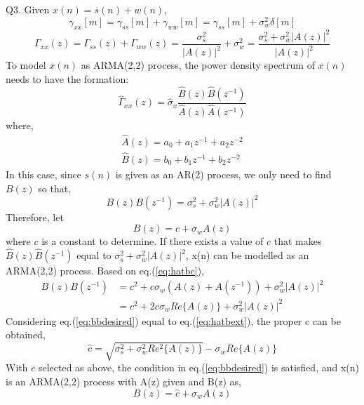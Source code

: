 \documentclass[12pt]{article}
\begin{document}
\noindent
Q3.
Given $x(n)=s(n)+w(n)$, 
\begin{equation}
	\gamma_{xx}[m]=\gamma_{ss}[m]+\gamma_{ww}[m]=\gamma_{ss}[m]+\sigma_{w}^{2}\delta[m]
\end{equation}
\begin{equation}
	\Gamma_{xx}(z)=\Gamma_{ss}(z)+\Gamma_{ww}(z)=\frac{\sigma_{s}^{2}}{|A(z)|^{2}}+\sigma_{w}^{2}=\frac{\sigma_{s}^{2}+\sigma_{w}^{2}|A(z)|^{2}}{|A(z)|^{2}}
\end{equation}
To model $x(n)$ as ARMA(2,2) process, the power density spectrum of $x(n)$ needs to have the formation:
\begin{equation}
	\hat{\Gamma}_{xx}(z)=\hat{\sigma}_{x}\frac{\hat{B}(z)\hat{B}(z^{-1})}{\hat{A}(z)\hat{A}(z^{-1})}
\end{equation}
where,
\begin{equation}
\begin{split}
	\hat{A}(z)=a_{0}+a_{1}z^{-1}+a_{2}z^{-2}\\
	\hat{B}(z)=b_{0}+b_{1}z^{-1}+b_{2}z^{-2}
\end{split}
\end{equation}
In this case, since $s(n)$ is given as an AR(2) process, we only need to find $B(z)$ so that,
\begin{equation}
\label{eq:bbdesired}
	B(z)B(z^{-1})=\sigma_{s}^{2}+\sigma_{w}^{2}|A(z)|^{2}
\end{equation}
Therefore, let 
\begin{equation}
\label{eq:hatbc}
	B(z)=c+\sigma_{w}A(z)
\end{equation}
where $c$ is a constant to determine. If there exists a value of $c$ that makes $\hat{B}(z)\hat{B}(z^{-1})$ equal to $\sigma_{s}^{2}+\sigma_{w}^{2}|A(z)|^{2}$, x(n) can be modelled as an ARMA(2,2) process. 
Based on eq.(\ref{eq:hatbc}), 
\begin{equation}
\label{eq:hatbext}
\begin{split}
		B(z)B(z^{-1})&=c^{2}+c\sigma_{w}(A(z)+A(z^{-1}))+\sigma_{w}^{2}|A(z)|^{2}\\
		&=c^{2}+2c\sigma_{w}Re\{A(z)\}+\sigma_{w}^{2}|A(z)|^{2}
\end{split}
\end{equation}
Considering eq.(\ref{eq:bbdesired}) equal to eq.(\ref{eq:hatbext}), the proper c can be obtained,
\begin{equation}
	\hat{c}=\sqrt{\sigma_{s}^{2}+\sigma_{w}^{2}Re^{2}\{A(z)\}}-\sigma_{w}Re\{A(z)\}
\end{equation}
With $c$ selected as above, the condition in eq.(\ref{eq:bbdesired}) is satisfied, and x(n) is an ARMA(2,2) process with A(z) given and B(z) as,
\begin{equation}
	B(z)=\hat{c}+\sigma_{w}A(z)
\end{equation}
\end{document}
